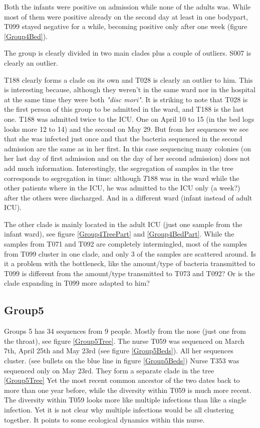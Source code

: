 \documentclass[12pt,a4paper]{article}
\begin{document}
Both the infants were positive on admission while none of the adults was. While most of them were positive already on the second day at least in one bodypart, T099 stayed negative for a while, becoming positive only after one week (figure \ref{Group4Bed}).

The group is clearly divided in two main clades plus a couple of outliers. S007 is clearly an outlier.



 T188 clearly forms a clade on its own and T028 is clearly an outlier to him. This is interesting because, although they weren't in the same ward nor in the hospital at the same time they were both \textit{"disc mori"}.
 It is striking to note that T028 is the first person of this group to be admitted in the ward, and T188 is the last one.  
T188 was admitted twice to the ICU. One on April 10 to 15 (in the bed logs looks more 12 to 14) and the second on May 29. But from her sequences we see that she was infected just once and that the bacteria sequenced in the second admission are the same as in her first. In this case sequencing many colonies (on her last day of first admission and on the day of her second admission) does not add much information. Interestingly, the segregation of samples in the tree corresponds to segregation in time: although $T188$ was in the ward while the other patients where in the ICU, he was admitted to the ICU only (a week?) after the others were discharged. And in a different ward (infant instead of adult ICU).   
 
The other clade is mainly located in the adult ICU (just one sample from the infant ward), see figure \ref{Group4TreePart} and \ref{Group4BedPart}. While the samples from T071 and T092 are completely intermingled, most of the samples from T099 cluster in one clade, and only 3 of the samples are scattered around. Is it a problem with the bottleneck, like the amount/type of bacteria transmitted to T099 is different from the amount/type transmitted to T073 and T092? Or is the clade expanding in T099 more adapted to him? 

  

\subsection{Group5}
Groups 5 has 34 sequences from 9 people. Mostly from the nose (just one from the throat), see figure \ref{Group5Tree}.
The nurse T059 was sequenced on March 7th, April 25th and May 23rd (see figure \ref{Group5Beds}). All her sequences cluster. (see bullets on the blue line in figure \ref{Group5Beds})
Nurse T353 was sequenced only on May 23rd. They form a separate clade in the tree \ref{Group5Tree} Yet the most recent common ancestor of the two dates back to more than one year before, while the diversity within T059 is much more recent. The diversity within T059 looks more like multiple infections than like a single infection. Yet it is not clear why multiple infections would be all clustering together. It points to some ecological dynamics within this nurse.
\end{document}
